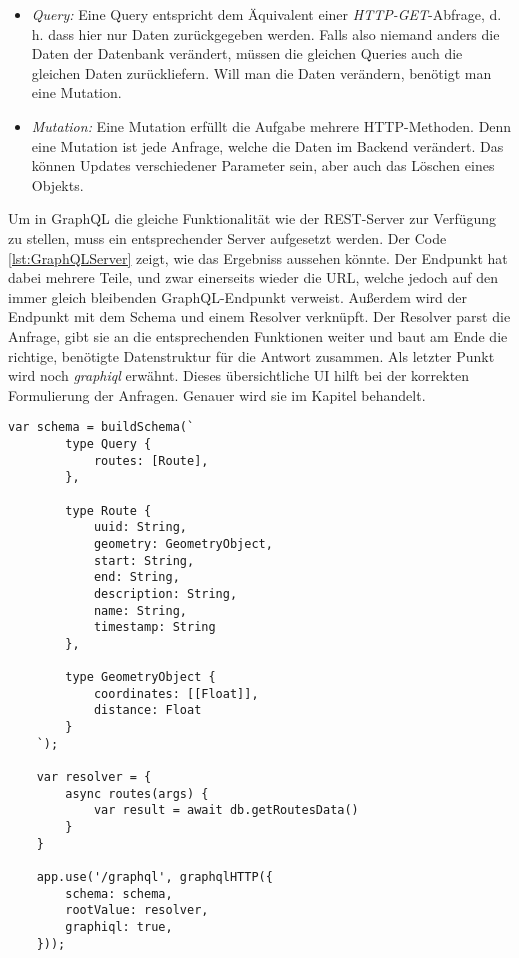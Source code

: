 \begin{itemize}
\item \textit{Query:} Eine Query entspricht dem Äquivalent einer \textit{HTTP-GET}-Abfrage, d.\,h. dass hier nur Daten zurückgegeben werden. Falls also niemand anders die Daten der Datenbank verändert, müssen die gleichen Queries auch die gleichen Daten zurückliefern. Will man die Daten verändern, benötigt man eine Mutation.
\item \textit{Mutation:} Eine Mutation erfüllt die Aufgabe mehrere   HTTP-Methoden. Denn eine Mutation ist jede Anfrage, welche die Daten im Backend verändert. Das können Updates verschiedener Parameter sein, aber auch das Löschen eines Objekts.
\end{itemize}
Um in GraphQL die gleiche Funktionalität wie der REST-Server zur Verfügung zu stellen, muss ein entsprechender Server aufgesetzt werden. Der Code \ref{lst:GraphQLServer} zeigt, wie das Ergebniss aussehen könnte. Der Endpunkt hat dabei mehrere Teile, und zwar einerseits wieder die \ac{URL}, welche jedoch auf den immer gleich bleibenden GraphQL-Endpunkt verweist. Außerdem wird der Endpunkt mit dem Schema und einem Resolver verknüpft. Der Resolver parst die Anfrage, gibt sie an die entsprechenden Funktionen weiter und baut am Ende die richtige, benötigte Datenstruktur für die Antwort zusammen. Als letzter Punkt wird noch \textit{graphiql} erwähnt. Dieses übersichtliche \ac{UI} hilft bei der korrekten Formulierung der Anfragen. Genauer wird sie im Kapitel  behandelt.

\begin{lstlisting}[caption={GraphQL Server Implementierung},captionpos=b,label=lst:GraphQLServer] 
	var schema = buildSchema(`
		type Query {
			routes: [Route],
		},

		type Route {
			uuid: String,
			geometry: GeometryObject,
			start: String,
			end: String,
			description: String,
			name: String,
			timestamp: String
		},

		type GeometryObject {
			coordinates: [[Float]],
			distance: Float
		}
	`);

	var resolver = {
		async routes(args) {
			var result = await db.getRoutesData()
		}
	}

	app.use('/graphql', graphqlHTTP({
		schema: schema,
		rootValue: resolver,
		graphiql: true,
	}));
\end{lstlisting}

